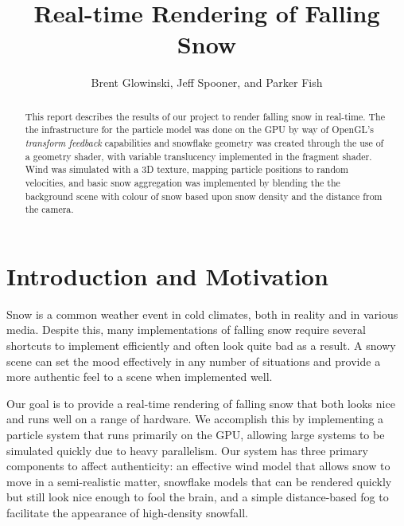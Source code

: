 \documentclass[conference]{acmsiggraph}
\title{Real-time Rendering of Falling Snow}
\author{Brent Glowinski, Jeff Spooner, and Parker Fish}
\begin{document}
\maketitle

\begin{abstract}
This report describes the results of our project to render falling snow in real-time. The the infrastructure for the particle model was done on the GPU by way of OpenGL's \textit{transform feedback} capabilities and snowflake geometry was created through the use of a geometry shader, with variable translucency implemented in the fragment shader. Wind was simulated with a 3D texture, mapping particle positions to random velocities, and basic snow aggregation was implemented by blending the the background scene with colour of snow based upon snow density and the distance from the camera.

\end{abstract}

\keywordlist

\copyrightspace

\section{Introduction and Motivation}
Snow is a common weather event in cold climates, both in reality and in various media. Despite this, many implementations of falling snow require several shortcuts to implement efficiently and often look quite bad as a result. A snowy scene can set the mood effectively in any number of situations and provide a more authentic feel to a scene when implemented well.

Our goal is to provide a real-time rendering of falling snow that both looks nice and runs well on a range of hardware. We accomplish this by implementing a particle system that runs primarily on the GPU, allowing large systems to be simulated quickly due to heavy parallelism. Our system has three primary components to affect authenticity: an effective wind model that allows snow to move in a semi-realistic matter, snowflake models that can be rendered quickly but still look nice enough to fool the brain, and a simple distance-based fog to facilitate the appearance of high-density snowfall.
\end{document}
